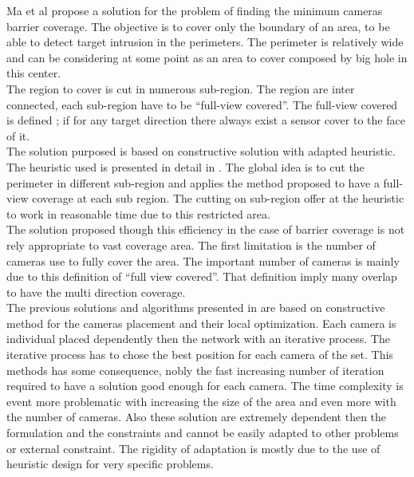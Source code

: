 Ma et al \cite{37*ma2012} propose a solution for the problem of finding the minimum cameras barrier coverage. The objective is to cover only the boundary of an area, to be able to detect target intrusion in the perimeters. The perimeter is relatively wide and can be considering at some point as an area to cover composed by big hole in this center.\\
 The region to cover is cut in numerous sub-region. The region are inter connected, each sub-region have to be “full-view covered”. The full-view covered is defined ; if for any target direction there always exist a sensor cover to the face of it.\\
The solution purposed is based on constructive solution with adapted heuristic. The heuristic used is presented in detail in \cite{37*ma2012}. The global idea is to cut the perimeter in different sub-region and applies the method proposed to have a full-view coverage at each sub region. 
The cutting on sub-region offer at the heuristic to work in reasonable time due to this restricted area.\\
The solution proposed though this efficiency in the case of barrier coverage is not rely appropriate to vast coverage area. The first limitation is the number of cameras use to fully cover the area. The important number of cameras is mainly due to this definition of “full view covered”. That definition imply many overlap to have the multi direction coverage.\\

The previous solutions and algorithms presented in \cite{38*liu2010, 37*ma2012,81*nikolaidis2009,171*horster2006} are based on constructive method for the cameras placement and their local optimization. Each camera is individual placed dependently then the network with an iterative process. The iterative process has to chose the best position for each camera of the set. This methods has some consequence, nobly the fast increasing number of iteration required to have a solution good enough for each camera. The time complexity is event more problematic with increasing the size of the area and even more with the number of cameras. Also these solution are extremely dependent then the formulation and the constraints and cannot be easily adapted to other problems or external constraint. The rigidity of adaptation is mostly due to the  use of heuristic  design for  very specific problems. 

